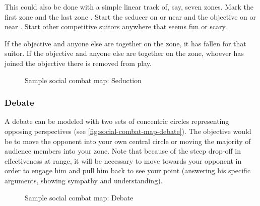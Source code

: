 This could also be done with a simple linear track of, say, seven zones. Mark the first zone \LOVERS{} and the last zone \JUSTFRIENDS{}. Start the seducer on or near \LOVERS{} and the objective on or near \JUSTFRIENDS{}. Start other competitive suitors anywhere that seems fun or scary.

If the objective and anyone else are together on the \LOVERS{} zone, it has fallen for that suitor. If the objective and anyone else are together on the \JUSTFRIENDS{} zone, whoever has joined the objective there is removed from play.

\begin{figure}
\centering\footnotesize

\caption{Sample social combat map: Seduction}
\label{fig:social-combat-map-seduction}
\end{figure}

\iflandscape{\clearpage}{}

\subsubsection{Debate}

A debate can be modeled with two sets of concentric circles representing opposing perspectives (see \autoref{fig:social-combat-map-debate}). The objective would be to move the opponent into your own central circle or moving the majority of audience members into your zone. Note that because of the steep drop-off in effectiveness at range, it will be necessary to move towards your opponent in order to engage him and pull him back to see your point (answering his specific arguments, showing sympathy and understanding).


\begin{figure}
\centering\footnotesize

\caption{Sample social combat map: Debate}
\label{fig:social-combat-map-debate}
\end{figure}

